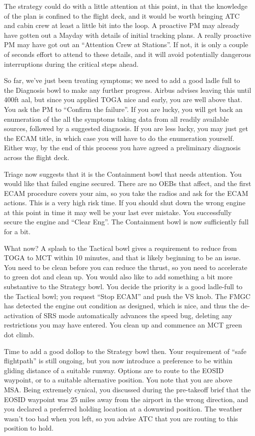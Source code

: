 \documentclass[a4paper,12pt]{article}
\begin{document}
The strategy could do with a little attention at this point, in that the
knowledge of the plan is confined to the flight deck, and it would be
worth bringing ATC and cabin crew at least a little bit into the loop. A
proactive PM may already have gotten out a Mayday with details of
initial tracking plans. A really proactive PM may have got out an
``Attention Crew at Stations''. If not, it is only a couple of seconds
effort to attend to these details, and it will avoid potentially
dangerous interruptions during the critical steps ahead.

So far, we've just been treating symptoms; we need to add a good ladle
full to the Diagnosis bowl to make any further progress. Airbus advises
leaving this until 400ft aal, but since you applied TOGA nice and early,
you are well above that. You ask the PM to ``Confirm the failure''. If
you are lucky, you will get back an enumeration of the all the symptoms
taking data from all readily available sources, followed by a suggested
diagnosis. If you are less lucky, you may just get the ECAM title, in
which case you will have to do the enumeration yourself. Either way, by
the end of this process you have agreed a preliminary diagnosis across
the flight deck.

Triage now suggests that it is the Containment bowl that needs
attention. You would like that failed engine secured. There are no OEBs
that affect, and the first ECAM procedure covers your aim, so you take
the radios and ask for the ECAM actions. This is a very high risk
time. If you should shut down the wrong engine at this point in time it
may well be your last ever mistake. You successfully secure the engine
and ``Clear Eng''. The Containment bowl is now sufficiently full for a
bit.

What now? A splash to the Tactical bowl gives a requirement to reduce
from TOGA to MCT within 10 minutes, and that is likely beginning to be
an issue. You need to be clean before you can reduce the thrust, so you
need to accelerate to green dot and clean up. You would also like to add
something a bit more substantive to the Strategy bowl. You decide the
priority is a good ladle-full to the Tactical bowl; you request ``Stop
ECAM'' and push the VS knob. The FMGC has detected the engine out
condition as designed, which is nice, and thus the de-activation of SRS
mode automatically advances the speed bug, deleting any restrictions you
may have entered. You clean up and commence an MCT green dot climb.

Time to add a good dollop to the Strategy bowl then. Your requirement of
``safe flightpath'' is still ongoing, but you now introduce a preference
to be within gliding distance of a suitable runway. Options are to route
to the EOSID waypoint, or to a suitable alternative position. You note
that you are above MSA. Being extremely cynical, you discussed during
the pre-takeoff brief that the EOSID waypoint was 25 miles away from the
airport in the wrong direction, and you declared a preferred holding
location at a downwind position. The weather wasn't too bad when you
left, so you advise ATC that you are routing to this position to hold.
\end{document}
